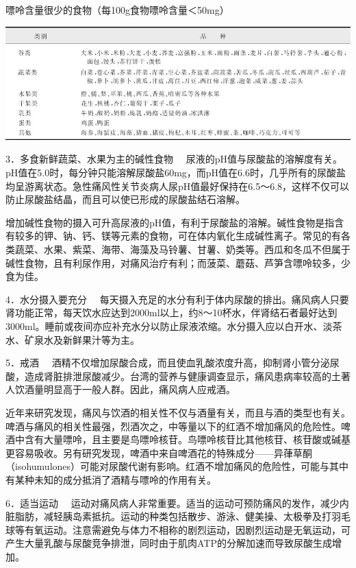 \begin{table}[htbp]
\centering
\caption{嘌呤含量很少的食物（每100g食物嘌呤含量＜50mg）}
\label{tab3-25}
\includegraphics{./images/Image00042.jpg}
\end{table}

{3．多食新鲜蔬菜、水果为主的碱性食物}
　尿液的pH值与尿酸盐的溶解度有关。pH值在5.0时，每分钟只能溶解尿酸盐60mg，而pH值在6.6时，几乎所有的尿酸盐均呈游离状态。急性痛风性关节炎病人尿pH值最好保持在6.5～6.8，这样不仅可以防止尿酸盐结晶，而且可以使已形成的尿酸盐结石溶解。

增加碱性食物的摄入可升高尿液的pH值，有利于尿酸盐的溶解。碱性食物是指含有较多的钾、钠、钙、镁等元素的食物，可在体内氧化生成碱性离子。常见的有各类蔬菜、水果、紫菜、海带、海藻及马铃薯、甘薯、奶类等。西瓜和冬瓜不但属于碱性食物，且有利尿作用，对痛风治疗有利；而菠菜、蘑菇、芦笋含嘌呤较多，少食为佳。

{4．水分摄入要充分}
　每天摄入充足的水分有利于体内尿酸的排出。痛风病人只要肾功能正常，每天饮水应达到2000ml以上，约8～10杯水，伴肾结石者最好达到3000ml。睡前或夜间亦应补充水分以防止尿液浓缩。水分摄入应以白开水、淡茶水、矿泉水及新鲜果汁等为主。

{5．戒酒}
　酒精不仅增加尿酸合成，而且使血乳酸浓度升高，抑制肾小管分泌尿酸，造成肾脏排泄尿酸减少。台湾的营养与健康调查显示，痛风患病率较高的土著人饮酒量明显高于一般人群。因此，痛风病人应戒酒。

近年来研究发现，痛风与饮酒的相关性不仅与酒量有关，而且与酒的类型也有关。啤酒与痛风的相关性最强，烈酒次之，中等量以下的红酒不增加痛风的危险性。啤酒中含有大量嘌呤，且主要是鸟嘌呤核苷。鸟嘌呤核苷比其他核苷、核苷酸或碱基更容易吸收。另有研究发现，啤酒中来自啤酒花的特殊成分------异葎草酮（isohumulones）可能对尿酸代谢有影响。红酒不增加痛风的危险性，可能与其中有某种未知的成分抵消了酒精与嘌呤的作用有关。

{6．适当运动}
　运动对痛风病人非常重要。适当的运动可预防痛风的发作，减少内脏脂肪，减轻胰岛素抵抗。运动的种类包括散步、游泳、健美操、太极拳及打羽毛球等有氧运动。注意需避免与体力不相称的剧烈运动，因剧烈运动是无氧运动，可产生大量乳酸与尿酸竞争排泄，同时由于肌肉ATP的分解加速而导致尿酸生成增加。

